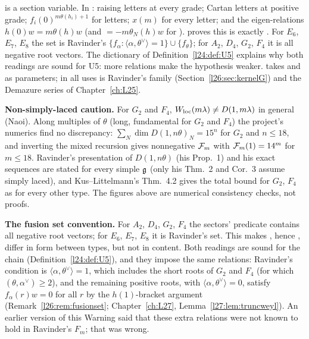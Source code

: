 \begin{dictionary}
 is a section variable. In : raising letters at every grade; Cartan letters at
positive grade; $f_i(0)^{m\theta(h_i)+1}$ for  letters; $x(m)$ for every  letter; and the eigen-relations
$h(0)w=m\theta(h)w$ (and $=-m\theta_N(h)w$ for ).  proves this is exactly
. For $E_6$, $E_7$, $E_8$ the  set is Ravinder's
$\{f_\alpha:\langle\alpha,\theta^\vee\rangle=1\}\cup\{f_\theta\}$; for $A_2$, $D_4$, $G_2$, $F_4$ it is all negative root vectors. The
dictionary of Definition~\ref{l24:def:U5} explains why both readings are sound for U5: more relations make the hypothesis weaker.
 takes  and  as parameters; in all uses  is Ravinder's family
 (Section~\ref{l26:sec:kernelG}) and  the Demazure series of Chapter~\ref{ch:L25}.

\textbf{Non-simply-laced caution.} For $G_2$ and $F_4$, $W_{\mathrm{loc}}(m\lambda)\neq D(1,m\lambda)$ in general (Naoi). Along
multiples of $\theta$ (long, fundamental for $G_2$ and $F_4$) the project's numerics find no discrepancy: $\sum_N\dim D(1,n\theta)_N=15^n$
for $G_2$ and $n\le18$, and inverting the mixed recursion gives nonnegative $\mathcal F_m$ with $\mathcal F_m(1)=14^m$ for $m\le18$.
Ravinder's presentation of $D(1,n\theta)$ (his Prop.~1) and his exact sequences are stated for every simple $\mathfrak g$ (only
his Thm.~2 and Cor.~3 assume simply laced), and Kus--Littelmann's Thm.~4.2 gives the total bound for $G_2$, $F_4$ as for every other
type. The figures above are numerical consistency checks, not proofs.
\end{dictionary}

\begin{warning}
\textbf{The fusion set convention.} For $A_2$, $D_4$, $G_2$, $F_4$ the sectors'  predicate contains all negative root
vectors; for $E_6$, $E_7$, $E_8$ it is Ravinder's set. This makes , hence , differ in
form between types, but not in content. Both readings are sound for the chain (Definition~\ref{l24:def:U5}), and they impose the
same relations: Ravinder's condition is $\langle\alpha,\theta^\vee\rangle=1$, which includes the short roots of $G_2$ and $F_4$ (for which
$(\theta,\alpha^\vee)\ge2$), and the remaining positive roots, with $\langle\alpha,\theta^\vee\rangle=0$, satisfy $f_\alpha(r)w=0$ for all $r$
by the $h(1)$-bracket argument (Remark~\ref{l26:rem:fusionset}; Chapter~\ref{ch:L27}, Lemma~\ref{l27:lem:truncweyl}). An earlier
version of this Warning said that these extra relations were not known to hold in Ravinder's $F_m$; that was wrong.
\end{warning}

